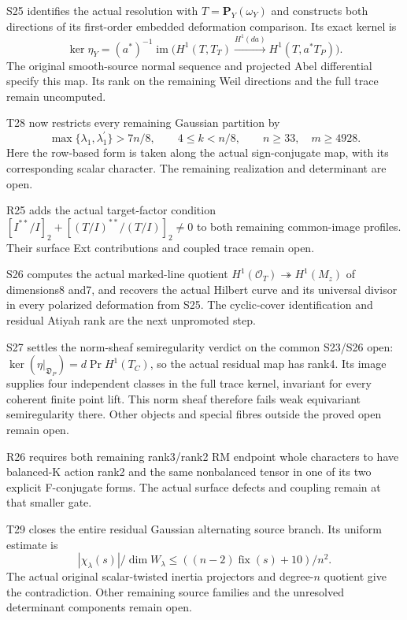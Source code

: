 S25 identifies the actual resolution with $T=\mathbf P_Y(\omega_Y)$ and constructs both directions of its first-order embedded deformation comparison. Its exact kernel is
\[\ker\eta_Y=(a^*)^{-1}\operatorname{im}\bigl(H^1(T,T_T)\xrightarrow{H^1(da)}H^1(T,a^*T_P)\bigr).\]
The original smooth-source normal sequence and projected Abel differential specify this map. Its rank on the remaining Weil directions and the full trace remain uncomputed.




T28 now restricts every remaining Gaussian partition by \[\max\{\lambda_1,\lambda_1^{\prime}\}>7n/8,\qquad 4\le k<n/8,\qquad n\ge33,\quad m\ge4928.\]
Here the row-based form is taken along the actual sign-conjugate map, with its corresponding scalar character. The remaining realization and determinant are open.




R25 adds the actual target-factor condition $[I^{**}/I]_2+[(T/I)^{**}/(T/I)]_2\ne0$ to both remaining common-image profiles. Their surface Ext contributions and coupled trace remain open.




S26 computes the actual marked-line quotient $H^1(\mathcal O_T)\twoheadrightarrow H^1(M_z)$ of dimensions8 and7, and recovers the actual Hilbert curve and its universal divisor in every polarized deformation from S25. The cyclic-cover identification and residual Atiyah rank are the next unpromoted step.




S27 settles the norm-sheaf semiregularity verdict on the common S23/S26 open: $\ker(\eta|_{\mathfrak D_P})=d\operatorname{Pr}H^1(T_C)$, so the actual residual map has rank4. Its image supplies four independent classes in the full trace kernel, invariant for every coherent finite point lift. This norm sheaf therefore fails weak equivariant semiregularity there. Other objects and special fibres outside the proved open remain open.




R26 requires both remaining rank3/rank2 RM endpoint whole characters to have balanced-K action rank2 and the same nonbalanced tensor in one of its two explicit F-conjugate forms. The actual surface defects and coupling remain at that smaller gate.




T29 closes the entire residual Gaussian alternating source branch. Its uniform estimate is \[|\chi_\lambda(s)|/\dim W_\lambda\le ((n-2)\operatorname{fix}(s)+10)/n^2.\]
The actual original scalar-twisted inertia projectors and degree-$n$ quotient give the contradiction. Other remaining source families and the unresolved determinant components remain open.




